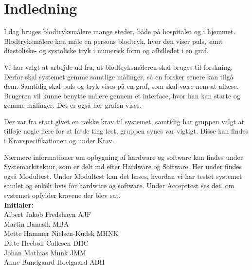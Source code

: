 \chapter{Indledning}
I  dag bruges blodtryksmålere mange steder, både på hospitalet og i hjemmet. Blodtryksmålere kan måle en persons blodtryk, hvor den viser puls, samt diastoliske- og systoliske tryk i numerisk form og afbilledet i en graf. 

Vi har valgt at arbejde ud fra, at blodtryksmåleren skal bruges til forskning. Derfor skal systemet gemme samtlige målinger, så en forsker senere kan tilgå dem. Samtidig skal puls og tryk vises på en graf, som skal være nem at aflæse. Brugeren vil kunne benytte målere gennem et interface, hvor han kan starte og gemme målinger. Det er også her grafen vises.

Der var fra start givet en række krav til systemet, samtidig har gruppen valgt at tilføje nogle flere for at få de ting løst, gruppen synes var vigtigt. Disse kan findes i Kravspecifikationen og under Krav.

Nærmere informationer om opbygning af hardware og software kan findes under Systemarkitektur, som er delt ind efter Hardware og Software. Her under findes også Modultest. 
Under Modultest kan det læses, hvordan vi har testet systemet samlet og enkelt hvis for hardware og software. Under Accepttest ses det, om systemet opfylder kravene der blev sat.\\ 


\textbf{Initialer: } \\
Albert Jakob Fredshavn \tab AJF \\
Martin Banasik \tab MBA \\
Mette Hammer Nielsen-Kudsk \tab MHNK \\
Ditte Heebøll Callesen \tab DHC \\
Johan Mathias Munk \tab JMM \\
Anne Bundgaard Hoelgaard \tab ABH \\

